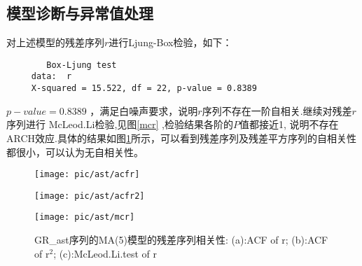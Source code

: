 \documentclass[10.5pt,onecolumn,a4paper]{article}%
\begin{document}
\subsection{模型诊断与异常值处理}

对上述模型的残差序列$r$进行Ljung-Box检验，如下：
\begin{framed}
\begin{verbatim} 
 	 	Box-Ljung test	 
 	 data:  r
 	 X-squared = 15.522, df = 22, p-value = 0.8389
\end{verbatim}
\end{framed}
$p-value=0.8389$ ，满足白噪声要求，说明$r$序列不存在一阶自相关.继续对残差$r$序列进行 McLeod.Li检验,见图\ref{mcr} ,检验结果各阶的$P$值都接近1, 说明不存在ARCH效应.具体的结果如图\ref{testr}所示，可以看到残差序列及残差平方序列的自相关性都很小，可以认为无自相关性。
\begin{figure}[h!]
	\begin{minipage}[ht]{0.31\textwidth}
		\centering
		\texttt{[image: pic/ast/acfr]}
		\subcaption{}\label{acfr}
	\end{minipage}%
	\hspace{0.02\textwidth}
	\begin{minipage}[ht]{0.31\textwidth}
		\centering
		\texttt{[image: pic/ast/acfr2]}
		\subcaption{}\label{acfr2}
	\end{minipage}
	\hspace{0.02\textwidth}
	\begin{minipage}[ht]{0.31\textwidth}
		\centering
		\texttt{[image: pic/ast/mcr]}
		\subcaption{}\label{mcr}
	\end{minipage}
	\caption{GR\_ast序列的MA(5)模型的残差序列相关性: (a):ACF of r; (b):ACF of r$^2$; (c):McLeod.Li.test of r}\label{testr}
\end{figure}
\end{document}

